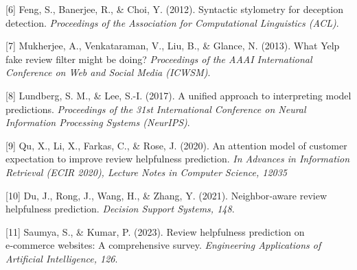 \documentclass[
]{article}
\begin{document}
{[}6{]} Feng, S., Banerjee, R., \& Choi, Y. (2012). Syntactic stylometry
for deception detection. \emph{Proceedings of the Association for
Computational Linguistics (ACL)}.

{[}7{]} Mukherjee, A., Venkataraman, V., Liu, B., \& Glance, N. (2013).
What Yelp fake review filter might be doing? \emph{Proceedings of the
AAAI International Conference on Web and Social Media (ICWSM)}.

{[}8{]} Lundberg, S. M., \& Lee, S.-I. (2017). A unified approach to
interpreting model predictions. \emph{Proceedings of the 31st
International Conference on Neural Information Processing Systems
(NeurIPS)}.

{[}9{]} Qu, X., Li, X., Farkas, C., \& Rose, J. (2020). An attention
model of customer expectation to improve review helpfulness prediction.
\emph{In Advances in Information Retrieval (ECIR 2020), Lecture Notes in
Computer Science, 12035}

{[}10{]} Du, J., Rong, J., Wang, H., \& Zhang, Y. (2021). Neighbor‑aware
review helpfulness prediction. \emph{Decision Support Systems, 148}.

{[}11{]} Saumya, S., \& Kumar, P. (2023). Review helpfulness prediction
on e‑commerce websites: A comprehensive survey. \emph{Engineering
Applications of Artificial Intelligence, 126}.
\end{document}
